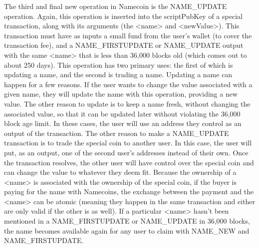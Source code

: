 The third and final new operation in Namecoin is the NAME\_UPDATE operation. Again, this operation is inserted into the scriptPubKey of a special transaction, along with its arguments (the <name> and <newValue>). This transaction must have as inputs a small fund from the user's wallet (to cover the transaction fee), and a NAME\_FIRSTUPDATE or NAME\_UPDATE output with the same <name> that is less than 36,000 blocks old (which comes out to about 250 days). This operation has two primary uses: the first of which is updating a name, and the second is trading a name. Updating a name can happen for a few reasons. If the user wants to change the value associated with a given name, they will update the name with this operation, providing a new value. The other reason to update is to keep a name fresh, without changing the associated value, so that it can be updated later without violating the 36,000 block age limit. In these cases, the user will use an address they control as an output of the transaction. The other reason to make a NAME\_UPDATE transaction is to trade the special coin to another user. In this case, the user will put, as an output, one of the second user's addresses instead of their own. Once the transaction resolves, the other user will have control over the special coin and can change the value to whatever they deem fit. Because the ownership of a <name> is associated with the ownership of the special coin, if the buyer is paying for the name with Namecoins,  the exchange between the payment and the <name> can be atomic (meaning they happen in the same transaction and either are only valid if the other is as well). If a particular <name> hasn't been mentioned in a NAME\_FIRSTUPDATE or NAME\_UPDATE in 36,000 blocks, the name becomes available again for any user to claim with NAME\_NEW and NAME\_FIRSTUPDATE. 


